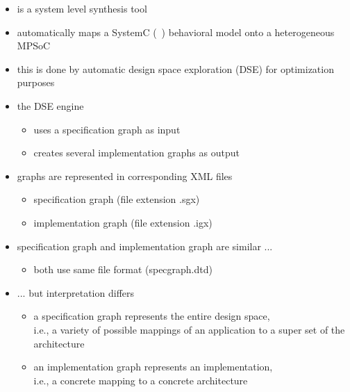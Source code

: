 \begin{frame}[t]
\begin{itemize}
\item \SystemCoDesigner{} is a system level synthesis tool
\item \SystemCoDesigner{} automatically maps a SystemC (\SysteMoC\ ) behavioral model onto a heterogeneous MPSoC
\item this is done by automatic design space exploration (DSE) for optimization purposes
\item the DSE engine
\begin{itemize}
\item uses a specification graph as input 
\item creates several implementation graphs as output
\end{itemize}
\item graphs are represented in corresponding XML files
\begin{itemize}
\item specification graph (file extension .sgx)
\item implementation graph (file extension .igx)
\end{itemize}
\end{itemize}
\end{frame}


\begin{frame}[t]
\begin{itemize}
\item specification graph and implementation graph are similar ...
\begin{itemize}
\item both use same file format (specgraph.dtd)
\end{itemize}
\item ... but interpretation differs
\begin{itemize}
\item a specification graph represents the entire design space,
\\ i.e., a variety of possible mappings of an application to a super set of the architecture
\item an implementation graph represents an implementation,
\\ i.e., a concrete mapping to a concrete architecture
\end{itemize}
\end{itemize}
\end{frame}



